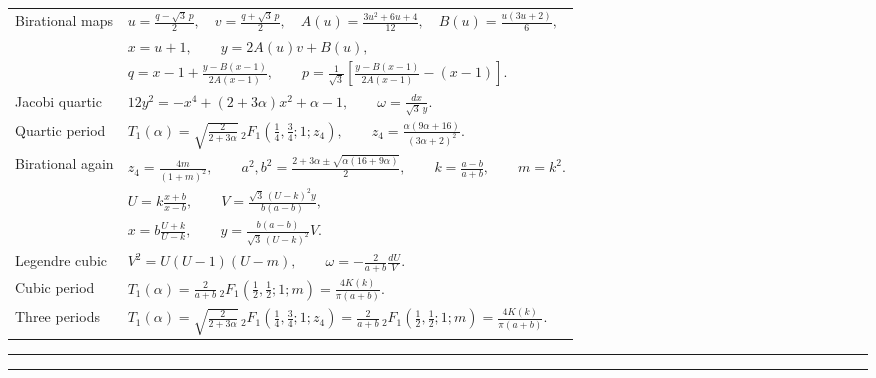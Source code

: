 \documentclass[9pt]{extarticle}
\newcommand{\DoubleRule}{\par\vspace{3pt}\hrule height 0.65pt\vspace{1.3pt}\hrule height 0.28pt\vspace{5.2pt}}
\begin{document}
{\fontsize{9.15}{13.15}\selectfont
\renewcommand{\arraystretch}{1.32}
\begin{tabularx}{\textwidth}{@{}J@{\hspace{0.10in}}Y@{}}
Birational maps &
$\displaystyle
u=\frac{q-\sqrt3\,p}{2},
\quad v=\frac{q+\sqrt3\,p}{2},
\quad A(u)=\frac{3u^2+6u+4}{12},
\quad B(u)=\frac{u(3u+2)}6,$ \\
& $\displaystyle
x=u+1,
\qquad y=2A(u)v+B(u),$ \\
& $\displaystyle
q=x-1+\frac{y-B(x-1)}{2A(x-1)},
\qquad
p=\frac1{\sqrt3}\!\left[\frac{y-B(x-1)}{2A(x-1)}-(x-1)\right].$ \\[10pt]

Jacobi quartic &
$\displaystyle
12y^2=-x^4+(2+3\alpha)x^2+\alpha-1,
\qquad
\omega=\frac{dx}{\sqrt3\,y}.$ \\[9pt]

Quartic period &
$\displaystyle
T_1(\alpha)=\sqrt{\frac2{2+3\alpha}}\,
{}_2F_1\!\left(\frac14,\frac34;1;z_4\right),
\qquad
z_4=\frac{\alpha(9\alpha+16)}{(3\alpha+2)^2}.$ \\[10pt]

Birational again &
{\fontsize{8.55}{11.2}\selectfont $\displaystyle
z_4=\frac{4m}{(1+m)^2},\qquad
 a^2,b^2=\frac{2+3\alpha\pm\sqrt{\alpha(16+9\alpha)}}2,\qquad
k=\frac{a-b}{a+b},\qquad m=k^2.$} \\[7pt]
& $\displaystyle
U=k\frac{x+b}{x-b},
\qquad
V=\frac{\sqrt3\,(U-k)^2y}{b(a-b)},$ \\[6pt]
& $\displaystyle
x=b\frac{U+k}{U-k},
\qquad
y=\frac{b(a-b)}{\sqrt3\,(U-k)^2}V.$ \\[10pt]

Legendre cubic &
$\displaystyle
V^2=U(U-1)(U-m),
\qquad
\omega=-\frac{2}{a+b}\frac{dU}{V}.$ \\[9pt]

Cubic period &
$\displaystyle
T_1(\alpha)=\frac{2}{a+b}
\,{}_2F_1\!\left(\frac12,\frac12;1;m\right)
=\frac{4K(k)}{\pi(a+b)}.$ \\[10pt]

Three periods &
{\fontsize{8.55}{11.2}\selectfont $\displaystyle
T_1(\alpha)=\sqrt{\frac2{2+3\alpha}}\,{}_2F_1\!\left(\frac14,\frac34;1;z_4\right)
=\frac{2}{a+b}\,{}_2F_1\!\left(\frac12,\frac12;1;m\right)
=\frac{4K(k)}{\pi(a+b)}.$} \\[12pt]
\end{tabularx}
}

\DoubleRule
\end{document}

